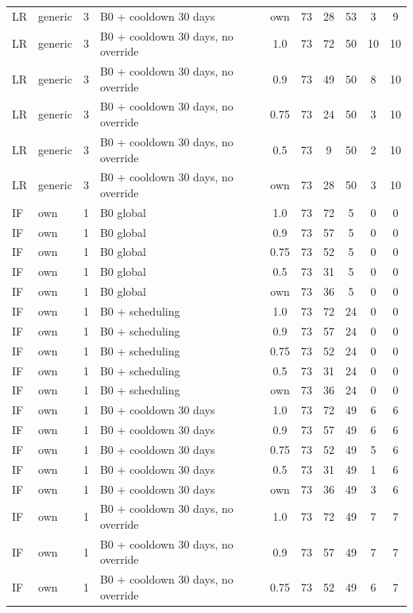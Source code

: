\documentclass[10pt,onecolumn,letterpaper]{article}
\begin{document}
\begin{longtable}{lllp{4.4cm}cccccc}
LR & generic & 3 & B0 + cooldown 30 days & own & 73 & 28 & 53 & 3 & 9 \\
LR & generic & 3 & B0 + cooldown 30 days, no override & 1.0 & 73 & 72 & 50 & 10 & 10 \\
LR & generic & 3 & B0 + cooldown 30 days, no override & 0.9 & 73 & 49 & 50 & 8 & 10 \\
LR & generic & 3 & B0 + cooldown 30 days, no override & 0.75 & 73 & 24 & 50 & 3 & 10 \\
LR & generic & 3 & B0 + cooldown 30 days, no override & 0.5 & 73 & 9 & 50 & 2 & 10 \\
LR & generic & 3 & B0 + cooldown 30 days, no override & own & 73 & 28 & 50 & 3 & 10 \\
IF & own & 1 & B0 global & 1.0 & 73 & 72 & 5 & 0 & 0 \\
IF & own & 1 & B0 global & 0.9 & 73 & 57 & 5 & 0 & 0 \\
IF & own & 1 & B0 global & 0.75 & 73 & 52 & 5 & 0 & 0 \\
IF & own & 1 & B0 global & 0.5 & 73 & 31 & 5 & 0 & 0 \\
IF & own & 1 & B0 global & own & 73 & 36 & 5 & 0 & 0 \\
IF & own & 1 & B0 + scheduling & 1.0 & 73 & 72 & 24 & 0 & 0 \\
IF & own & 1 & B0 + scheduling & 0.9 & 73 & 57 & 24 & 0 & 0 \\
IF & own & 1 & B0 + scheduling & 0.75 & 73 & 52 & 24 & 0 & 0 \\
IF & own & 1 & B0 + scheduling & 0.5 & 73 & 31 & 24 & 0 & 0 \\
IF & own & 1 & B0 + scheduling & own & 73 & 36 & 24 & 0 & 0 \\
IF & own & 1 & B0 + cooldown 30 days & 1.0 & 73 & 72 & 49 & 6 & 6 \\
IF & own & 1 & B0 + cooldown 30 days & 0.9 & 73 & 57 & 49 & 6 & 6 \\
IF & own & 1 & B0 + cooldown 30 days & 0.75 & 73 & 52 & 49 & 5 & 6 \\
IF & own & 1 & B0 + cooldown 30 days & 0.5 & 73 & 31 & 49 & 1 & 6 \\
IF & own & 1 & B0 + cooldown 30 days & own & 73 & 36 & 49 & 3 & 6 \\
IF & own & 1 & B0 + cooldown 30 days, no override & 1.0 & 73 & 72 & 49 & 7 & 7 \\
IF & own & 1 & B0 + cooldown 30 days, no override & 0.9 & 73 & 57 & 49 & 7 & 7 \\
IF & own & 1 & B0 + cooldown 30 days, no override & 0.75 & 73 & 52 & 49 & 6 & 7 \\

\end{longtable}
\end{document}
